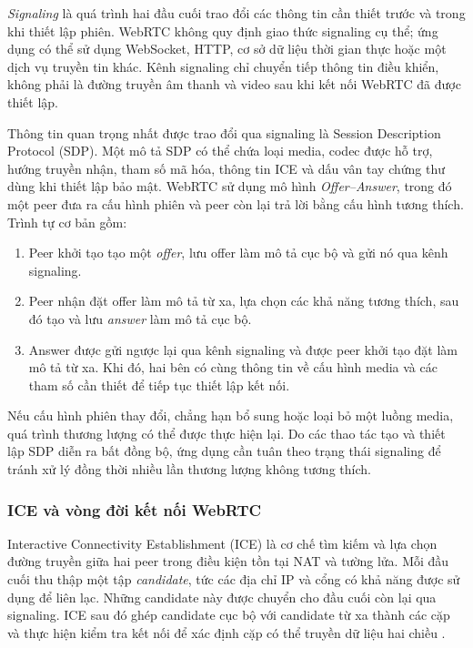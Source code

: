 \textit{Signaling} là quá trình hai đầu cuối trao đổi các thông tin cần thiết trước và trong khi thiết lập phiên. WebRTC không quy định giao thức signaling cụ thể; ứng dụng có thể sử dụng WebSocket, HTTP, cơ sở dữ liệu thời gian thực hoặc một dịch vụ truyền tin khác. Kênh signaling chỉ chuyển tiếp thông tin điều khiển, không phải là đường truyền âm thanh và video sau khi kết nối WebRTC đã được thiết lập.

Thông tin quan trọng nhất được trao đổi qua signaling là Session Description Protocol (SDP). Một mô tả SDP có thể chứa loại media, codec được hỗ trợ, hướng truyền nhận, tham số mã hóa, thông tin ICE và dấu vân tay chứng thư dùng khi thiết lập bảo mật. WebRTC sử dụng mô hình \textit{Offer--Answer}, trong đó một peer đưa ra cấu hình phiên và peer còn lại trả lời bằng cấu hình tương thích. Trình tự cơ bản gồm:

\begin{enumerate}
    \item Peer khởi tạo tạo một \textit{offer}, lưu offer làm mô tả cục bộ và gửi nó qua kênh signaling.

    \item Peer nhận đặt offer làm mô tả từ xa, lựa chọn các khả năng tương thích, sau đó tạo và lưu \textit{answer} làm mô tả cục bộ.

    \item Answer được gửi ngược lại qua kênh signaling và được peer khởi tạo đặt làm mô tả từ xa. Khi đó, hai bên có cùng thông tin về cấu hình media và các tham số cần thiết để tiếp tục thiết lập kết nối.
\end{enumerate}

Nếu cấu hình phiên thay đổi, chẳng hạn bổ sung hoặc loại bỏ một luồng media, quá trình thương lượng có thể được thực hiện lại. Do các thao tác tạo và thiết lập SDP diễn ra bất đồng bộ, ứng dụng cần tuân theo trạng thái signaling để tránh xử lý đồng thời nhiều lần thương lượng không tương thích.

\subsubsection{ICE và vòng đời kết nối WebRTC}

Interactive Connectivity Establishment (ICE) là cơ chế tìm kiếm và lựa chọn đường truyền giữa hai peer trong điều kiện tồn tại NAT và tường lửa. Mỗi đầu cuối thu thập một tập \textit{candidate}, tức các địa chỉ IP và cổng có khả năng được sử dụng để liên lạc. Những candidate này được chuyển cho đầu cuối còn lại qua signaling. ICE sau đó ghép candidate cục bộ với candidate từ xa thành các cặp và thực hiện kiểm tra kết nối để xác định cặp có thể truyền dữ liệu hai chiều .


